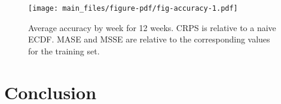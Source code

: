 \documentclass[
  authoryear,
  preprint,
  3p]{elsarticle}
\begin{document}
\begin{figure}

{\centering \texttt{[image: main\_files/figure-pdf/fig-accuracy-1.pdf]}

}

\caption{\label{fig-accuracy}Average accuracy by week for 12 weeks. CRPS
is relative to a naive ECDF. MASE and MSSE are relative to the
corresponding values for the training set.}

\end{figure}

\hypertarget{sec-conclusion}{%
\section{Conclusion}\label{sec-conclusion}}


\renewcommand\refname{References}
  
\end{document}
